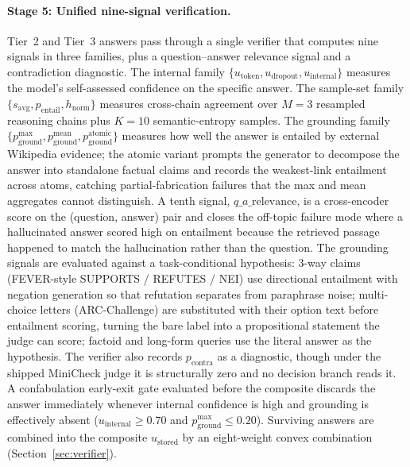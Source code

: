 \paragraph{Stage 5: Unified nine-signal verification.}
Tier~2 and Tier~3 answers pass through a single verifier that computes nine signals in three families, plus a question--answer relevance signal and a contradiction diagnostic. The internal family $\{u_{\text{token}}, u_{\text{dropout}}, u_{\text{internal}}\}$ measures the model's self-assessed confidence on the specific answer. The sample-set family $\{s_{\text{avg}}, p_{\text{entail}}, h_{\text{norm}}\}$ measures cross-chain agreement over $M{=}3$ resampled reasoning chains plus $K{=}10$ semantic-entropy samples. The grounding family $\{p_{\text{ground}}^{\max}, p_{\text{ground}}^{\text{mean}}, p_{\text{ground}}^{\text{atomic}}\}$ measures how well the answer is entailed by external Wikipedia evidence; the atomic variant prompts the generator to decompose the answer into standalone factual claims and records the weakest-link entailment across atoms, catching partial-fabrication failures that the max and mean aggregates cannot distinguish. A tenth signal, $q\_a\_\text{relevance}$, is a cross-encoder score on the (question, answer) pair and closes the off-topic failure mode where a hallucinated answer scored high on entailment because the retrieved passage happened to match the hallucination rather than the question. The grounding signals are evaluated against a task-conditional hypothesis: $3$-way claims (FEVER-style SUPPORTS / REFUTES / NEI) use directional entailment with negation generation so that refutation separates from paraphrase noise; multi-choice letters (ARC-Challenge) are substituted with their option text before entailment scoring, turning the bare label into a propositional statement the judge can score; factoid and long-form queries use the literal answer as the hypothesis. The verifier also records $p_{\text{contra}}$ as a diagnostic, though under the shipped MiniCheck judge it is structurally zero and no decision branch reads it. A confabulation early-exit gate evaluated before the composite discards the answer immediately whenever internal confidence is high and grounding is effectively absent ($u_{\text{internal}} \geq 0.70$ and $p_{\text{ground}}^{\max} \leq 0.20$). Surviving answers are combined into the composite $u_{\text{stored}}$ by an eight-weight convex combination (Section~\ref{sec:verifier}).

